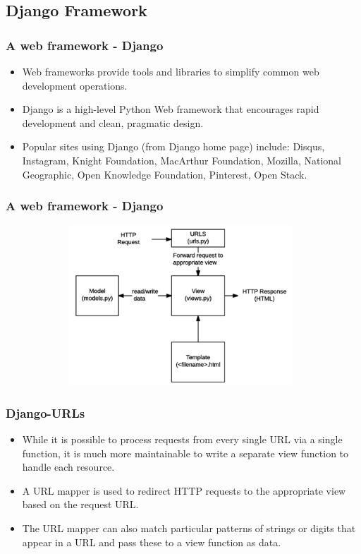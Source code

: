 \documentclass{beamer}
\begin{document}
\subsection{Django Framework}
\begin{frame}
\frametitle{A web framework - Django }
\begin{itemize}
 \item Web frameworks provide tools and libraries to simplify common web development operations.
 \item Django is a high-level Python Web framework that encourages rapid development and clean, pragmatic design. 
 \item Popular sites using Django (from Django home page) include: Disqus, Instagram, Knight Foundation, MacArthur Foundation, Mozilla, National Geographic, Open Knowledge Foundation, Pinterest, Open Stack.
   \end{itemize}
\end{frame}
\begin{frame}
\frametitle{A web framework - Django }
\begin{figure}
	    \centering
	    \includegraphics[height=6cm,width=11cm]{l3.png}
	\end{figure}
\end{frame}
\begin{frame}
\frametitle{Django-URLs }
\begin{itemize}
 \item While it is possible to process requests from every single URL via a single function, it is much more maintainable to write a separate view function to handle each resource. 
 \item A URL mapper is used to redirect HTTP requests to the appropriate view based on the request URL. 
 \item The URL mapper can also match particular patterns of strings or digits that appear in a URL and pass these to a view function as data.
   \end{itemize}
\end{frame}
\end{document}
